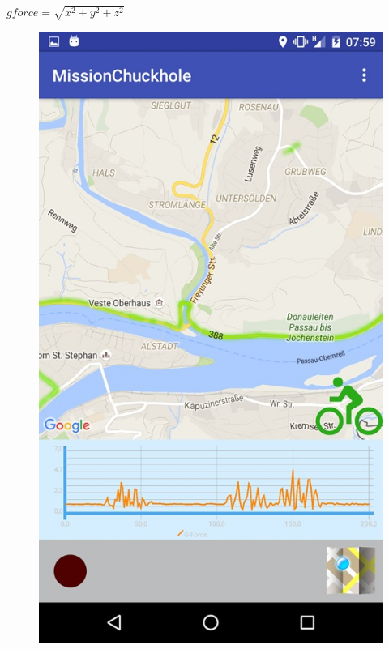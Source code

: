 \documentclass[10pt,a4paper]{article} %
\begin{document}
    
	\begin{center}
		$ gforce = \sqrt{x^2 + y^2 + z^2} $
	\end{center}

	
	
    
    
    \begin{figure}[H]
	\centering
    \includegraphics[scale=0.4]{pic2}
    \end{figure}
    
\end{document}
